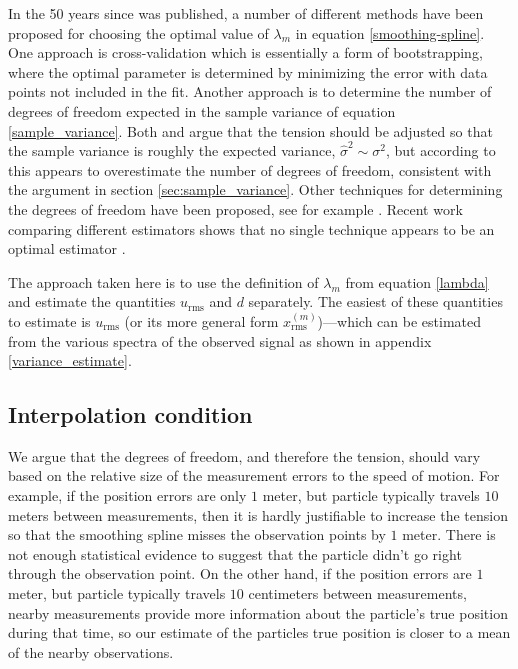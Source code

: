 \documentclass[10pt,journal]{IEEEtran}
\begin{document}
In the 50 years since \cite{reinsch1967-nm} was published, a number of different methods have been proposed for choosing the optimal value of $\lambda_m$ in equation \ref{smoothing-spline}. One approach is cross-validation \cite{wahba1978-jrss-b,craven1979-nm} which is essentially a form of bootstrapping, where the optimal parameter is determined by minimizing the error with data points not included in the fit. Another approach is to determine the number of degrees of freedom expected in the sample variance of equation \ref{sample_variance}. Both \cite{reinsch1967-nm} and \cite{teanby2007-mg} argue that the tension should be adjusted so that the sample variance is roughly the expected variance, $\hat{\sigma}^2 \sim \sigma^2$, but according to \cite{wahba1990-siam} this appears to overestimate the number of degrees of freedom, consistent with the argument in section \ref{sec:sample_variance}. Other techniques for determining the degrees of freedom have been proposed, see for example \cite{cantoni2002-biom}. Recent work comparing different estimators shows that no single technique appears to be an optimal estimator \cite{lee2003-csda}.

The approach taken here is to use the definition of $\lambda_m$ from equation \ref{lambda} and estimate the quantities $u_{\textrm{rms}}$ and $d$ separately. The easiest of these quantities to estimate is $u_{\textrm{rms}}$ (or its more general form $x^{(m)}_{\textrm{rms}}$)---which can be estimated from the various spectra of the observed signal as shown in appendix \ref{variance_estimate}.

\subsection{Interpolation condition} \label{interpolation_condition}

We argue that the degrees of freedom, and therefore the tension, should vary based on the relative size of the measurement errors to the speed of motion. For example, if the position errors are only $1$ meter, but particle typically travels $10$ meters between measurements, then it is hardly justifiable to increase the tension so that the smoothing spline misses the observation points by $1$ meter. There is not enough statistical evidence to suggest that the particle didn't go right through the observation point. On the other hand, if the position errors are  $1$ meter, but particle typically travels $10$ centimeters between measurements, nearby measurements provide more information about the particle's true position during that time, so our estimate of the particles true position is closer to a mean of the nearby observations.
\end{document}

